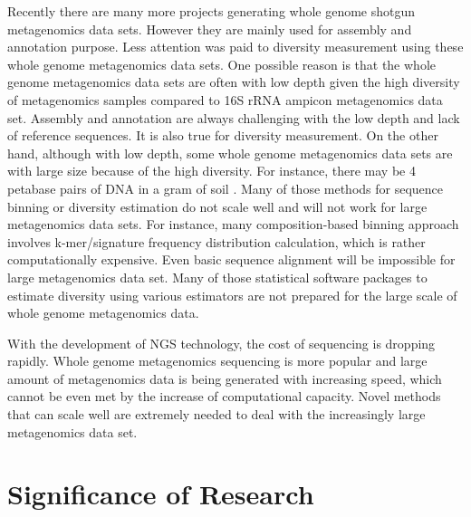 Recently there are many more projects generating whole genome shotgun
metagenomics data sets. However they are 
mainly used for assembly and annotation purpose. Less attention was paid to
diversity measurement
using these whole genome metagenomics data sets. One possible reason is that
the whole genome metagenomics
data sets are often with low depth given the high diversity of metagenomics
samples compared to 16S rRNA
ampicon metagenomics data set. Assembly and annotation are always challenging
with the low depth and lack of 
reference sequences. It is also true for diversity measurement. On the other
hand, although with low depth, some whole genome metagenomics 
data sets are with large size because of the high diversity. For instance,
there may be 4 petabase
pairs of DNA in a gram of soil \cite{Zarraonaindia:2013aa}. Many of those methods for
sequence binning or diversity 
estimation do not scale well and will not work for large metagenomics data
sets. For instance,
many composition-based binning approach involves k-mer/signature frequency
distribution calculation, which is 
rather computationally expensive. Even basic sequence alignment will be
impossible for large metagenomics data set.
Many of those statistical software packages to estimate diversity using various
estimators are not prepared 
for the large scale of whole genome metagenomics data. 

With the development of NGS technology, the cost of
sequencing is dropping rapidly. Whole genome metagenomics sequencing is more
popular and large amount of metagenomics data is being generated with
increasing speed, which cannot be even met by the increase of computational
capacity. Novel methods that can scale well are extremely needed to deal with
the increasingly large metagenomics data set.


\section{Significance of Research}


